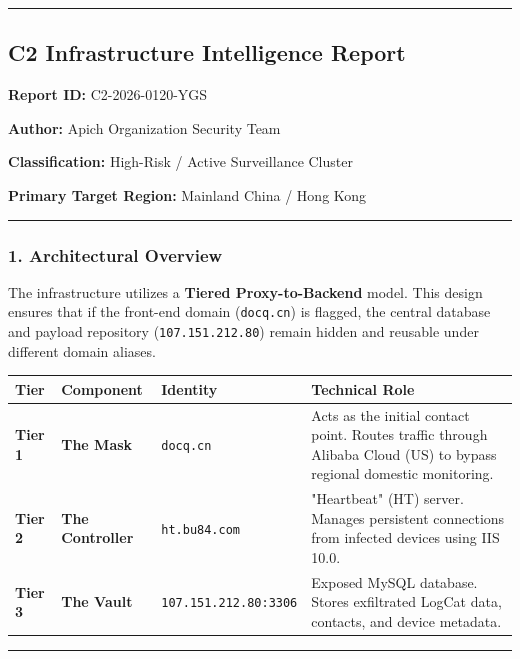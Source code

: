 \documentclass[
]{article}
\begin{document}
\begin{center}\rule{0.5\linewidth}{0.5pt}\end{center}

\subsection{C2 Infrastructure Intelligence
Report}\label{c2-infrastructure-intelligence-report}

\textbf{Report ID:} C2-2026-0120-YGS

\textbf{Author:} Apich Organization Security Team

\textbf{Classification:} High-Risk / Active Surveillance Cluster

\textbf{Primary Target Region:} Mainland China / Hong Kong

\begin{center}\rule{0.5\linewidth}{0.5pt}\end{center}

\subsubsection{1. Architectural
Overview}\label{1-architectural-overview}

The infrastructure utilizes a \textbf{Tiered Proxy-to-Backend} model.
This design ensures that if the front-end domain (\texttt{docq.cn}) is
flagged, the central database and payload repository
(\texttt{107.151.212.80}) remain hidden and reusable under different
domain aliases.

\begin{longtable}[]{@{}llll@{}}
\toprule\noalign{}
Tier & Component & Identity & Technical Role \\
\midrule\noalign{}
\endhead
\bottomrule\noalign{}
\endlastfoot
\textbf{Tier 1} & \textbf{The Mask} & \texttt{docq.cn} & Acts as the
initial contact point. Routes traffic through Alibaba Cloud (US) to
bypass regional domestic monitoring. \\
\textbf{Tier 2} & \textbf{The Controller} & \texttt{ht.bu84.com} &
"Heartbeat" (HT) server. Manages persistent connections from infected
devices using IIS 10.0. \\
\textbf{Tier 3} & \textbf{The Vault} & \texttt{107.151.212.80:3306} &
Exposed MySQL database. Stores exfiltrated LogCat data, contacts, and
device metadata. \\
\end{longtable}

\begin{center}\rule{0.5\linewidth}{0.5pt}\end{center}
\end{document}
